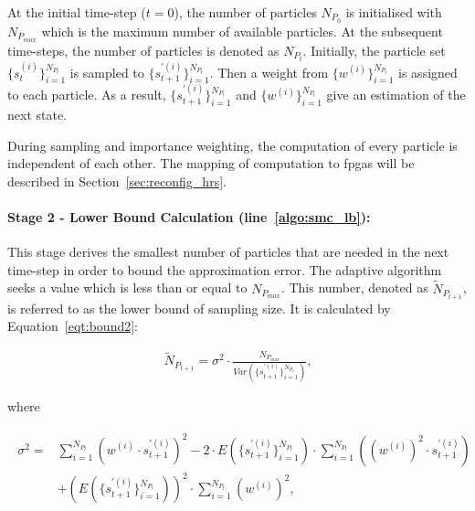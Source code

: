 At the initial time-step ($t=0$), the number of particles ${N_{P_0}}$ is initialised with ${N_{P_{max}}}$ which is the maximum number of available particles.
At the subsequent time-steps, the number of particles is denoted as ${N_{P_t}}$.
Initially, the particle set $\{s_{t}^{(i)}\}^{N_{P_t}}_{i=1}$ is sampled to $\{s_{t+1}^{\prime(i)}\}^{N_{P_t}}_{i=1}$.
Then a weight from $\{w^{(i)}\}^{N_{P_t}}_{i=1}$ is assigned to each particle. 
As a result, $\{s_{t+1}^{\prime(i)}\}^{N_{P_t}}_{i=1}$ and $\{w^{(i)}\}^{N_{P_t}}_{i=1}$ give an estimation of the next state.

During sampling and importance weighting, the computation of every particle is independent of each other. 
The mapping of computation to \glspl{fpga} will be described in Section~\ref{sec:reconfig_hrs}.

\paragraph{Stage 2 - Lower Bound Calculation (line~\ref{algo:smc_lb}): }

This stage derives the smallest number of particles that are needed in the next time-step in order to bound the approximation error.
The adaptive algorithm seeks a value which is less than or equal to ${N_{P_{max}}}$.
This number, denoted as $\widetilde{N}_{P_{t+1}}$, is referred to as the lower bound of sampling size.
It is calculated by Equation~\ref{eqt:bound2}:

\begin{equation}
\begin{aligned}
\widetilde{N}_{P_{t+1}} = \sigma^2 \cdot \frac{{N_{P_{max}}}}{Var(\{s_{t+1}^{\prime(i)}\}^{N_{P_t}}_{i=1})} \mbox{,}
\end{aligned}
\label{eqt:bound2}
\end{equation}

where

\begin{eqnarray}
\begin{aligned}
\sigma^2 = & \sum_{i=1}^{{N_{P_t}}}\left({w}^{(i)} \cdot s_{t+1}^{\prime(i)} \right)^2 - 2 \cdot E(\{s_{t+1}^{\prime(i)}\}^{N_{P_t}}_{i=1}) \cdot \sum_{i=1}^{N_{P_t}} \left ( ({w}^{(i)})^2 \cdot s_{t+1}^{\prime(i)} \right ) \\
& + \left(E(\{s_{t+1}^{\prime(i)}\}^{N_{P_t}}_{i=1})\right)^2 \cdot \sum_{i=1}^{N_{P_t}}({w}^{(i)})^2 \mbox{,}
\end{aligned}
\label{eqt:bound3}
\end{eqnarray}


